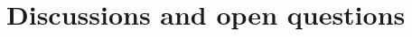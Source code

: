 \documentclass{article}
\newtheorem{prop}[theorem]{Proposition}
\newcommand{\TODO}[1]{\begingroup\color{red}#1\endgroup}
\begin{document}
%
%
%
%
%
%
%
%
%
%
%
%
%

\section{Discussions and open questions}
\label{sect:discuss}
\end{document}
